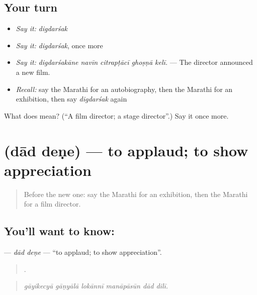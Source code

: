 \subsection*{Your turn}
\begin{itemize}
\raggedright
  \item \emph{Say it:} \emph{digdarśak}
  \item \emph{Say it:} \emph{digdarśak}, once more
  \item \emph{Say it:} \emph{digdarśakāne navīn citrapṭācī ghoṣṇā kelī.} — The director announced a new film.
  \item \emph{Recall:} say the Marathi for an autobiography, then the Marathi for an exhibition, then say \emph{digdarśak} again
\end{itemize}

\begin{tcolorbox}[breakable,colback=teal!4,colframe=teal!35!black,title={Before you move on}]
What does  mean? (\textquotedblleft{}A film director; a stage director\textquotedblright{}.) Say it once more.
\end{tcolorbox}
\section[\texorpdfstring{\mr{दाद} \mr{देणे} (dād deṇe)}{दाद देणे (dād deṇe)}]{  (dād deṇe) — to applaud; to show appreciation}

\label{lesson:MR-C539-dad-dene}



\begin{quote}
Before the new one: say the Marathi for an exhibition, then the Marathi for a film director.
\end{quote}

\subsection*{You'll want to know:  }
\textbf{ } — \emph{dād deṇe} — \textquotedblleft{}to applaud; to show appreciation\textquotedblright{}.

\begin{quote}
     .
\end{quote}

\begin{quote}
\emph{gāyikecyā gāṇyālā lokānnī manāpāsūn dād dilī.}
\end{quote}

